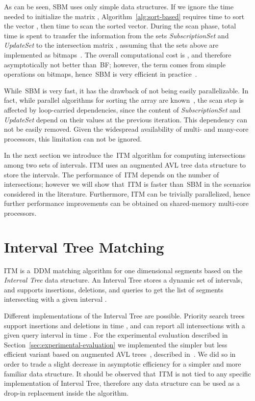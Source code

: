 \documentclass[10pt, conference, compsocconf]{IEEEtran}
\begin{document}
As can be seen, \ac{SBM} uses only simple data structures. If we
ignore the time needed to initialize the matrix ,
Algorithm~\ref{alg:sort-based} requires time  to sort the vector , then time  to scan the sorted
vector. During the scan phase, total time  is spent to transfer
the information from the sets \textit{SubscriptionSet} and
\textit{UpdateSet} to the intersection matrix , assuming
that the sets above are implemented as bitmaps~\cite{Raczy2005}. The
overall computational cost is ,
and therefore asymptotically not better than~\ac{BF}; however, the
term  comes from simple operations on bitmaps, hence~\ac{SBM}
is very efficient in practice~\cite{Raczy2005}.

While~\ac{SBM} is very fast, it has the drawback of not being easily
parallelizable. In fact, while parallel algorithms for sorting the
array  are known~\cite{parallel-merge-sort}, the scan step is
affected by loop-carried dependencies, since the content of
\textit{SubscriptionSet} and \textit{UpdateSet} depend on their
values at the previous iteration. This dependency can not be easily
removed. Given the widespread availability of multi- and many-core
processors, this limitation can not be ignored.

In the next section we introduce the~\acl{ITM} algorithm for computing
intersections among two sets of intervals. \ac{ITM} uses an augmented
AVL tree data structure to store the intervals.  The performance
of~\ac{ITM} depends on the number of intersections; however we will
show that~\ac{ITM} is faster than~\ac{SBM} in the scenarios considered
in the literature.  Furthermore, \ac{ITM} can be trivially
parallelized, hence further performance improvements can be obtained
on shared-memory multi-core processors.


\section{Interval Tree Matching}\label{sec:parallel-ddm}

\ac{ITM} is a~\ac{DDM} matching algorithm for one dimensional segments
based on the \emph{Interval Tree} data structure. An Interval Tree
stores a dynamic set of  intervals, and supports insertions,
deletions, and queries to get the list of segments intersecting with a
given interval . 

Different implementations of the Interval Tree are possible. Priority
search trees~\cite{McCreight85} support insertions and deletions in
time , and can report all  intersections with a given
query interval in time .  For the experimental
evaluation described in Section~\ref{sec:experimental-evaluation} we
implemented the simpler but less efficient variant based on augmented
AVL trees~\cite{avl}, described in~\cite[Chapter 14.3]{Cormen2009}. We
did so in order to trade a slight decrease in asymptotic efficiency
for a simpler and more familiar data structure. It should be observed
that~\ac{ITM} is not tied to any specific implementation of Interval
Tree, therefore any data structure can be used as a drop-in
replacement inside the algorithm.
\end{document}
